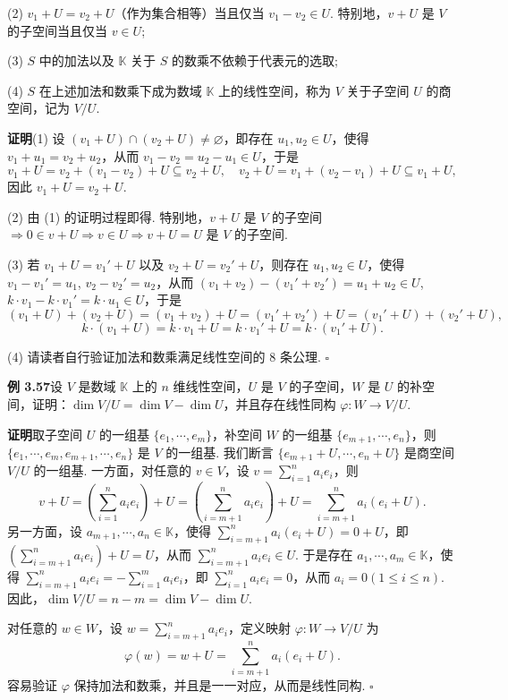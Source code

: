 \documentclass[UTF8, 12pt, fontset=fandol, oneside]{ctexart}
\begin{document}
(2) $v_1+U=v_2+U$（作为集合相等）当且仅当 $v_1-v_2\in U$. 特别地，$v+U$ 是 $V$ 的子空间当且仅当 $v\in U$;

(3) $S$ 中的加法以及 $\mathbb{K}$ 关于 $S$ 的数乘不依赖于代表元的选取;

(4) $S$ 在上述加法和数乘下成为数域 $\mathbb{K}$ 上的线性空间，称为 $V$ 关于子空间 $U$ 的商空间，记为 $V/U$.

\noindent\textbf{证明}\quad (1) 设 $(v_1+U)\cap(v_2+U)\ne\varnothing$，即存在 $u_1,u_2\in U$，使得 $v_1+u_1=v_2+u_2$，从而 $v_1-v_2=u_2-u_1\in U$，于是
\[
v_1+U=v_2+(v_1-v_2)+U\subseteq v_2+U,\quad
v_2+U=v_1+(v_2-v_1)+U\subseteq v_1+U,
\]
因此 $v_1+U=v_2+U$.

(2) 由 (1) 的证明过程即得. 特别地，$v+U$ 是 $V$ 的子空间 $\Rightarrow 0\in v+U\Rightarrow v\in U\Rightarrow v+U=U$ 是 $V$ 的子空间.

(3) 若 $v_1+U=v_1'+U$ 以及 $v_2+U=v_2'+U$，则存在 $u_1,u_2\in U$，使得 $v_1-v_1'=u_1$, $v_2-v_2'=u_2$，从而 $(v_1+v_2)-(v_1'+v_2')=u_1+u_2\in U$, $k\cdot v_1-k\cdot v_1'=k\cdot u_1\in U$，于是
\[
(v_1+U)+(v_2+U)=(v_1+v_2)+U=(v_1'+v_2')+U=(v_1'+U)+(v_2'+U),
\]
\[
k\cdot(v_1+U)=k\cdot v_1+U=k\cdot v_1'+U=k\cdot(v_1'+U).
\]

(4) 请读者自行验证加法和数乘满足线性空间的 8 条公理. $\square$

\noindent\textbf{例 3.57}\quad 设 $V$ 是数域 $\mathbb{K}$ 上的 $n$ 维线性空间，$U$ 是 $V$ 的子空间，$W$ 是 $U$ 的补空间，证明：$\dim V/U=\dim V-\dim U$，并且存在线性同构 $\varphi:W\to V/U$.

\noindent\textbf{证明}\quad 取子空间 $U$ 的一组基 $\{e_1,\cdots,e_m\}$，补空间 $W$ 的一组基 $\{e_{m+1},\cdots,e_n\}$，则 $\{e_1,\cdots,e_m,e_{m+1},\cdots,e_n\}$ 是 $V$ 的一组基. 我们断言 $\{e_{m+1}+U,\cdots,e_n+U\}$ 是商空间 $V/U$ 的一组基. 一方面，对任意的 $v\in V$，设 $v=\sum_{i=1}^n a_ie_i$，则
\[
v+U=\left(\sum_{i=1}^n a_ie_i\right)+U
=\left(\sum_{i=m+1}^n a_ie_i\right)+U
=\sum_{i=m+1}^n a_i(e_i+U).
\]
另一方面，设 $a_{m+1},\cdots,a_n\in\mathbb{K}$，使得 $\sum_{i=m+1}^n a_i(e_i+U)=0+U$，即 $\left(\sum_{i=m+1}^n a_ie_i\right)+U=U$，从而 $\sum_{i=m+1}^n a_ie_i\in U$. 于是存在 $a_1,\cdots,a_m\in\mathbb{K}$，使得 $\sum_{i=m+1}^n a_ie_i=-\sum_{i=1}^m a_ie_i$，即 $\sum_{i=1}^n a_ie_i=0$，从而 $a_i=0(1\le i\le n)$. 因此，$\dim V/U=n-m=\dim V-\dim U$.

对任意的 $w\in W$，设 $w=\sum_{i=m+1}^n a_ie_i$，定义映射 $\varphi:W\to V/U$ 为
\[
\varphi(w)=w+U=\sum_{i=m+1}^n a_i(e_i+U).
\]
容易验证 $\varphi$ 保持加法和数乘，并且是一一对应，从而是线性同构. $\square$
\end{document}
